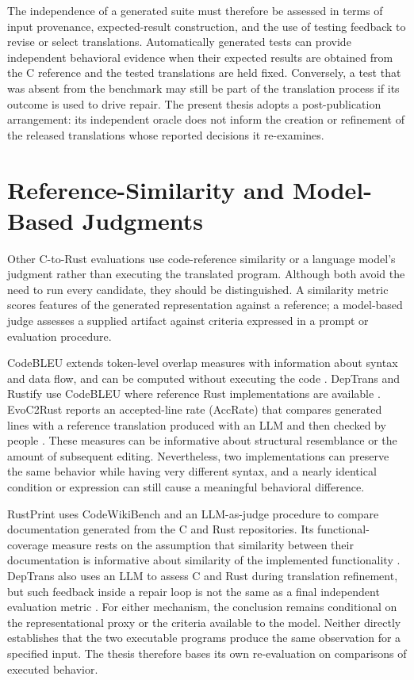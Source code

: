 The independence of a generated suite must therefore be assessed in
terms of input provenance, expected-result construction, and the use of
testing feedback to revise or select translations. Automatically
generated tests can provide independent behavioral evidence when their
expected results are obtained from the C reference and the tested
translations are held fixed. Conversely, a test that was absent from the
benchmark may still be part of the translation process if its outcome is
used to drive repair. The present thesis adopts a post-publication
arrangement: its independent oracle does not inform the creation or
refinement of the released translations whose reported decisions it
re-examines.

\section{Reference-Similarity and Model-Based Judgments}
\label{sec:rw-model}

Other C-to-Rust evaluations use code-reference similarity or a language
model's judgment rather than executing the translated program. Although
both avoid the need to run every candidate, they should be
distinguished. A similarity metric scores features of the generated
representation against a reference; a model-based judge assesses a
supplied artifact against criteria expressed in a prompt or evaluation
procedure.

CodeBLEU extends token-level overlap measures with information about
syntax and data flow, and can be computed without executing the code
\cite{ren2020codebleu}. DepTrans and Rustify use CodeBLEU where
reference Rust implementations are available
\cite{feng2026deptrans,rustify2026}. EvoC2Rust reports an accepted-line
rate (AccRate) that compares generated lines with a reference translation produced with an LLM and then checked by people \cite{wang2026evoc2rust}. These measures can
be informative about structural resemblance or the amount of subsequent
editing. Nevertheless, two implementations can preserve the same
behavior while having very different syntax, and a nearly identical
condition or expression can still cause a meaningful behavioral
difference.

RustPrint uses CodeWikiBench and an LLM-as-judge procedure to compare
documentation generated from the C and Rust repositories. Its
functional-coverage measure rests on the assumption that similarity
between their documentation is informative about similarity of the
implemented functionality \cite{leanh2026rustprint}. DepTrans also uses
an LLM to assess C and Rust during translation refinement, but such
feedback inside a repair loop is not the same as a final independent
evaluation metric \cite{feng2026deptrans}. For either mechanism, the
conclusion remains conditional on the representational proxy or the
criteria available to the model. Neither directly establishes that the
two executable programs produce the same observation for a specified
input. The thesis therefore bases its own re-evaluation on comparisons of executed behavior.

